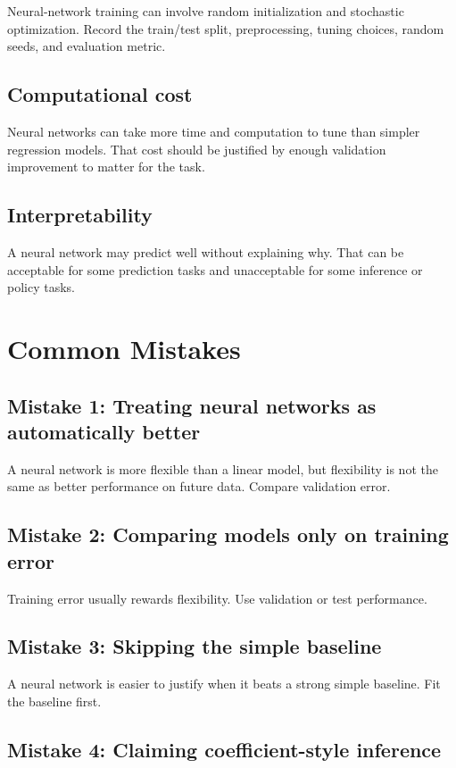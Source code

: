 Neural-network training can involve random initialization and stochastic optimization.  Record the train/test split, preprocessing, tuning choices, random seeds, and evaluation metric.

\subsection*{Computational cost}

Neural networks can take more time and computation to tune than simpler regression models.  That cost should be justified by enough validation improvement to matter for the task.

\subsection*{Interpretability}

A neural network may predict well without explaining why.  That can be acceptable for some prediction tasks and unacceptable for some inference or policy tasks.

\section{Common Mistakes}

\subsection*{Mistake 1: Treating neural networks as automatically better}

A neural network is more flexible than a linear model, but flexibility is not the same as better performance on future data.  Compare validation error.

\subsection*{Mistake 2: Comparing models only on training error}

Training error usually rewards flexibility.  Use validation or test performance.

\subsection*{Mistake 3: Skipping the simple baseline}

A neural network is easier to justify when it beats a strong simple baseline.  Fit the baseline first.

\subsection*{Mistake 4: Claiming coefficient-style inference}

